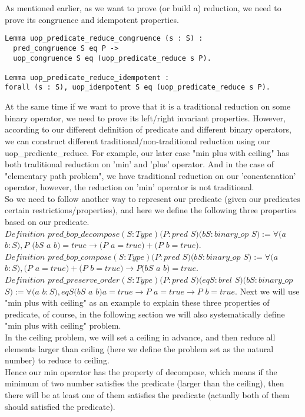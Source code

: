 \documentclass[a4paper,12pt,twoside,openright]{report}
\begin{document}
As mentioned earlier, as we want to prove (or build a) reduction, we need to prove its congruence and idempotent properties.
\begin{lstlisting}
Lemma uop_predicate_reduce_congruence (s : S) :
  pred_congruence S eq P -> 
  uop_congruence S eq (uop_predicate_reduce s P). 
  
Lemma uop_predicate_reduce_idempotent : 
forall (s : S), uop_idempotent S eq (uop_predicate_reduce s P). 
\end{lstlisting}
At the same time if we want to prove that it is a traditional reduction on some binary operator, we need to prove its left/right invariant properties.
However, according to our different definition of predicate and different binary operators, we can construct different traditional/non-traditional reduction using our uop\_predicate\_reduce. 
For example, our later case "min plus with ceiling" has both traditional reduction on 'min' and 'plus' operator. And in the case of "elementary path problem", we have traditional reduction on our 'concatenation' operator, however, the reduction on 'min' operator is not traditional.\\
So we need to follow another way to represent our predicate (given our predicates certain restrictions/properties), and here we define the following three properties based on our predicate.\\
$Definition$ $pred\_bop\_decompose (S : Type) (P : pred$ $S) (bS : binary\_op$ $S) 
  := \forall (a$ $b : S), P$ $(bS$ $a$ $b) = true \rightarrow (P$ $a = true) + (P$ $b = true).$\\
$Definition$ $pred\_bop\_compose (S : Type) (P : pred$ $S) (bS : binary\_op$ $S) 
  := \forall (a$ $b : S), (P$ $a = true) + (P$ $b = true) \rightarrow P (bS$ $a$ $b) = true.$\\
$Definition$ $pred\_preserve\_order (S : Type) (P : pred$ $S) (eqS : brel$ $S) (bS : binary\_op$ $S)
  := \forall (a$ $b : S), eqS (bS$ $a$ $b) a = true \rightarrow P$ $a = true \rightarrow P$ $b = true.$
Next we will use "min plus with ceiling" as an example to explain these three properties of predicate, of course, in the following section we will also systematically define "min plus with ceiling" problem.\\
In the ceiling problem, we will set a ceiling in advance, and then reduce all elements larger than ceiling (here we define the problem set as the natural number) to reduce to ceiling. \\
Hence our min operator has the property of decompose, which means if the minimum of two number satisfies the predicate (larger than the ceiling), then there will be at least one of them satisfies the predicate (actually both of them should satisfied the predicate).\\
\end{document}
